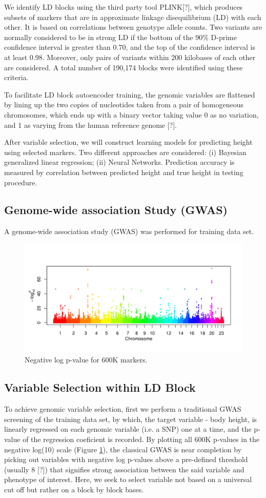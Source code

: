 \documentclass[acmtog, authorversion]{acmart}
\begin{document}
We identify LD blocks using the third party tool PLINK[?], which produces subsets of markers that are in approximate linkage disequilibrium (LD) with each other. It is based on correlations between genotype allele counts. Two variants are normally considered to be in strong LD if the bottom of the 90\% D-prime confidence interval is greater than 0.70, and the top of the confidence interval is at least 0.98. Moreover, only pairs of variants within 200 kilobases of each other are considered.  A total number of 190,174 blocks were identified using these criteria.

To facilitate LD block autoencoder training, the genomic variables are flattened by lining up the two copies of nucleotides taken from a pair of homogeneous chromosomes, which ends up with a binary vector taking value 0 as no variation, and 1 as varying from the human reference genome [?].

After variable selection, we will construct learning models for predicting height using selected markers. Two different approaches are considered: (i) Bayesian generalized linear regression; (ii) Neural Networks. Prediction accuracy is measured by correlation between predicted height and true height in testing procedure. 

\subsection{Genome-wide association Study (GWAS)}
A genome-wide association study (GWAS) was performed for training data set. 

\begin{figure}[h]
  \centering
  \includegraphics[width=3.5 in, trim=0 0 0in 0]{img/gwas_height}
  \caption{Negative log p-value for 600K markers.}
  \label{gwas}
\end{figure}

\subsection{Variable Selection within LD Block}
To achieve genomic variable selection, first we perform a traditional GWAS screening of the training data set, by which, the target variable - body height, is linearly regressed on each genomic variable (i.e. a SNP) one at a time, and the p-value of the regression coeficient is recorded. By plotting all 600K p-values in the negative log(10) scale (Figure \ref{gwas}), the classical GWAS is near completion by picking out variables with negative log p-values above a pre-defined threshold (usually 8 [?]) that signifies strong association between the said variable and phenotype of interest. Here, we seek to select variable not based on a universal cut off but rather on a block by block bases.
\end{document}
